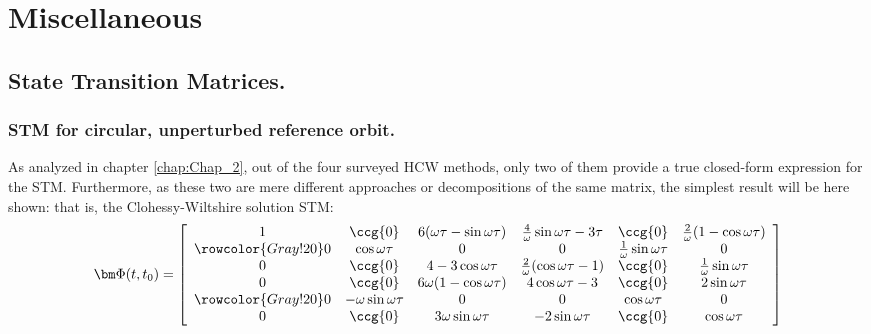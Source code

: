 \chapter{Miscellaneous}
%
\label{app:App_E}
%
\section{State Transition Matrices.}
%
%
	\subsection{STM for circular, unperturbed reference orbit.}
	\indent As analyzed in chapter \ref{chap:Chap_2}, out of the four surveyed HCW methods, only two of them provide a true closed-form expression for the STM. Furthermore, as these two are mere different approaches or decompositions of the same matrix, the simplest result will be here shown: that is, the Clohessy-Wiltshire solution STM:
	\begin{equation}
	\bm \Phi (t, t_0) = \left[
	\begin{array}{cccccc}
	1	& \ccg{0}					& 6(\omega\tau - \sin\omega\tau)	& \frac{4}{\omega} \sin\omega\tau - 3\tau	& \ccg{0}						& \frac{2}{\omega} (1 - \cos\omega\tau) \\
	\rowcolor{Gray!20}
	0	& \cos\omega\tau			& 0									& 0 										&\frac{1}{\omega}\sin\omega\tau & 0 \\
	0	& \ccg{0}					& 4 - 3 \cos\omega\tau				& \frac{2}{\omega} (\cos\omega\tau - 1)		& \ccg{0}						& \frac{1}{\omega} \sin\omega\tau\\
	0	& \ccg{0}					& 6\omega (1 - \cos\omega\tau)		& 4\cos\omega\tau - 3						& \ccg{0}						& 2\sin\omega\tau	\\
	\rowcolor{Gray!20}
	0	& -\omega \sin\omega\tau	& 0									& 0											& \cos\omega\tau				& 0\\
	0	& \ccg{0}					& 3\omega\sin\omega\tau 			& -2 \sin\omega\tau							& \ccg{0}						& \cos\omega\tau
	\end{array}\right]
	\label{eqAppE:CW_STM}
	\end{equation}
